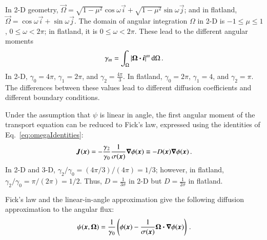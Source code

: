 \documentclass{anstrans}
\begin{document}
In 2-D geometry, $\vec{\Omega}=\sqrt{1-\mu^2} \cos \omega \vec{i} +
\sqrt{1-\mu^2} \sin \omega \vec{j}$; and in flatland, $\vec{\Omega}=\cos \omega
\vec{i} + \sin \omega \vec{j}$. The domain of angular integration $\Omega$ in
2-D is $-1\le\mu\le1$, $0 \le \omega < 2\pi$; in flatland, it is $0 \le \omega
< 2\pi$. These lead to the different angular moments
\begin{equation}\label{eq:omegaIdentities}
  \gamma_m = \int_{\Omega} \left| \bm{\Omega}\bm{\cdot} \bm{i} \right|^m \mathop{}\!\mathrm{d}\Omega\,.
\end{equation}
In 2-D, $\gamma_0=4\pi$, $\gamma_1=2\pi$, and $\gamma_2=\frac{4\pi}{3}$.
In flatland, $\gamma_0=2\pi$, $\gamma_1=4$, and $\gamma_2=\pi$. The
differences between these values lead to different diffusion 
coefficients and different boundary conditions.

Under the assumption that $\psi$ is linear in angle, the first angular moment
of the transport equation can be reduced to Fick's law, expressed using the
identities of Eq.~\eqref{eq:omegaIdentities}:
\begin{equation} \label{eq:fickGeneral}
  \bm{J}(\bm{x})
  = - \frac{\gamma_2}{\gamma_0} \frac{1}{\sigma(\bm{x})} \bm{\nabla} \phi(\bm{x})
  \equiv -D(\bm{x}) \bm{\nabla} \phi(\bm{x})\,.
\end{equation}
In 2-D and 3-D, $\gamma_2/\gamma_0 = (4\pi / 3) / (4\pi) = 1/3$; however, in
flatland, $\gamma_2/\gamma_0 = \pi / (2\pi) = 1/2$. Thus, $D=\frac{1}{3\sigma}$ in
2-D but $D=\frac{1}{2\sigma}$ in flatland.

Fick's law and the linear-in-angle approximation give the following diffusion
approximation to the angular flux:
\begin{equation} \label{eq:diffusionIntensity}
  \psi(\bm{x}, \bm{\Omega})
  = \frac{1}{\gamma_0} \left( \phi(\bm{x})
  - \frac{1}{\sigma(\bm{x})}
  \bm{\Omega} \bm{\cdot} \bm{\nabla} \phi(\bm{x}) \right) \,.
\end{equation}

\end{document}
